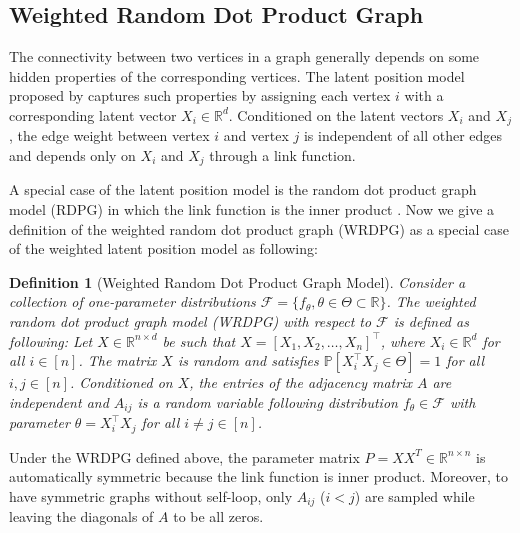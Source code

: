 \documentclass[a4paper]{article}
\newtheorem{definition}[fact]{Definition}
\begin{document}
\subsection{Weighted Random Dot Product Graph}
\label{section:WRDPG}

The connectivity between two vertices in a graph generally depends on some hidden properties of the corresponding vertices. The latent position model proposed by \citet{hoff2002latent} captures such properties by assigning each vertex $i$ with a corresponding latent vector $X_i \in \mathbb{R}^d$. Conditioned on the latent vectors $X_i$ and $X_j$, the edge weight between vertex $i$ and vertex $j$ is independent of all other edges and depends only on $X_i$ and $X_j$ through a link function.

A special case of the latent position model is the random dot product graph model (RDPG) in which the link function is the inner product \citep{young2007random, nickel2007random}. Now we give a definition of the weighted random dot product graph (WRDPG) as a special case of the weighted latent position model as following:
\begin{definition}[Weighted Random Dot Product Graph Model]
Consider a collection of one-parameter distributions $\mathcal{F} = \{ f_{\theta}, \theta \in \Theta \subset \mathbb{R} \}$. The weighted random dot product graph model (WRDPG) with respect to $\mathcal{F}$ is defined as following: Let $X \in \mathbb{R}^{n \times d}$ be such that $X = [X_1, X_2, \dotsc, X_n]^{\top}$, where $X_i \in \mathbb{R}^d$ for all $i \in [n]$. The matrix $X$ is random and satisfies $\mathbb{P}\left[ X_i^{\top} X_j \in \Theta \right] = 1$ for all $i, j \in [n]$. Conditioned on $X$, the entries of the adjacency matrix $A$ are independent and $A_{ij}$ is a random variable following distribution $f_{\theta} \in \mathcal{F}$ with parameter $\theta = X_i^{\top} X_j $ for all $i \ne j \in [n]$.
\end{definition}
Under the WRDPG defined above, the parameter matrix $P = X X^T \in \mathbb{R}^{n \times n}$ is automatically symmetric because the link function is inner product. Moreover, to have symmetric graphs without self-loop, only $A_{ij}$ ($i < j$) are sampled while leaving the diagonals of $A$ to be all zeros.
\end{document}

